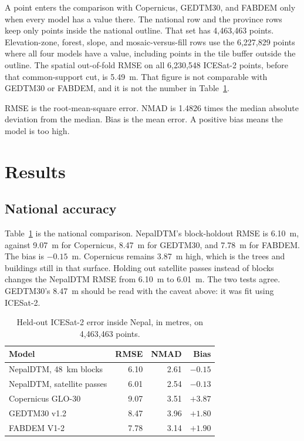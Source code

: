 \documentclass[11pt]{article}
\begin{document}
A point enters the comparison with Copernicus, GEDTM30, and FABDEM only when every model has a value there.
The national row and the province rows keep only points inside the national outline.
That set has 4,463,463 points.
Elevation-zone, forest, slope, and mosaic-versus-fill rows use the 6,227,829 points where all four models have a value, including points in the tile buffer outside the outline.
The spatial out-of-fold RMSE on all 6,230,548 ICESat-2 points, before that common-support cut, is 5.49~m.
That figure is not comparable with GEDTM30 or FABDEM, and it is not the number in Table~\ref{tab:national}.

RMSE is the root-mean-square error.
NMAD is 1.4826 times the median absolute deviation from the median.
Bias is the mean error.
A positive bias means the model is too high.

\section{Results}

\subsection{National accuracy}

Table~\ref{tab:national} is the national comparison.
NepalDTM's block-holdout RMSE is 6.10~m, against 9.07~m for Copernicus, 8.47~m for GEDTM30, and 7.78~m for FABDEM.
The bias is $-0.15$~m.
Copernicus remains 3.87~m high, which is the trees and buildings still in that surface.
Holding out satellite passes instead of blocks changes the NepalDTM RMSE from 6.10~m to 6.01~m.
The two tests agree.
GEDTM30's 8.47~m should be read with the caveat above: it was fit using ICESat-2.

\begin{table}[ht]
  \centering
  \caption{Held-out ICESat-2 error inside Nepal, in metres, on 4,463,463 points.}
  \label{tab:national}
  \begin{tabular}{@{}lrrr@{}}
    \toprule
    Model & RMSE & NMAD & Bias \\
    \midrule
    NepalDTM, 48~km blocks & 6.10 & 2.61 & $-0.15$ \\
    NepalDTM, satellite passes & 6.01 & 2.54 & $-0.13$ \\
    Copernicus GLO-30 & 9.07 & 3.51 & $+3.87$ \\
    GEDTM30 v1.2 & 8.47 & 3.96 & $+1.80$ \\
    FABDEM V1-2 & 7.78 & 3.14 & $+1.90$ \\
    \bottomrule
  \end{tabular}
\end{table}
\end{document}

